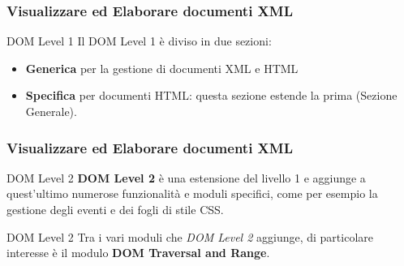 \begin{frame}
    \frametitle{Visualizzare ed Elaborare documenti XML}
    \addtocounter{nframe}{1}
         
     \begin{block}{DOM Level 1}
        Il DOM Level 1 è diviso in due sezioni:
        \begin{itemize}
            \item[1] \textbf{Generica} per la gestione di documenti XML e HTML
            \item[2] \textbf{Specifica} per documenti HTML: questa sezione estende la prima (Sezione Generale).
        \end{itemize}
      \end{block}

\end{frame}

\begin{frame}
    \frametitle{Visualizzare ed Elaborare documenti XML}
    \addtocounter{nframe}{1}
    

     \begin{block}{DOM Level 2}
       \textbf{DOM Level 2} è una estensione del livello 1 e aggiunge a quest'ultimo numerose funzionalità e moduli specifici, come per esempio la gestione degli eventi e dei fogli di stile CSS.
     \end{block}
     

     \begin{block}{DOM Level 2}
       Tra i vari moduli che \textit{DOM Level 2} aggiunge, di particolare interesse è il modulo \textbf{DOM Traversal and Range}.
      \end{block}

\end{frame}

